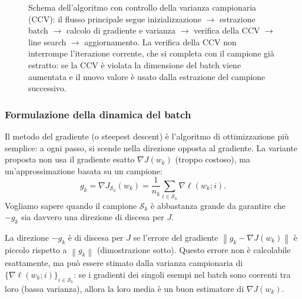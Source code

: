 \documentclass[a4paper,12pt]{article}
\numberwithin{equation}{section}
\numberwithin{figure}{section}
\numberwithin{table}{section}
\newcommand{\norm}[1]{\left\|#1\right\|}
\begin{document}
\begin{figure}[H]
{}
\caption{Schema dell'algoritmo con controllo della varianza campionaria (CCV):
il flusso principale segue inizializzazione $\to$ estrazione batch $\to$
calcolo di gradiente e varianza $\to$ verifica della CCV $\to$ line search
$\to$ aggiornamento. La verifica della CCV non interrompe l'iterazione corrente,
che si completa con il campione gi\`a estratto: se la CCV \`e violata la
dimensione del batch viene aumentata e il nuovo valore \`e usato dalla
estrazione del campione successivo.}
\label{fig:block_diagram}
\end{figure}

\subsubsection{Formulazione della dinamica del batch}

Il metodo del gradiente (o steepest descent) \`e l'algoritmo di ottimizzazione pi\`u semplice: a ogni passo, si scende nella direzione opposta al gradiente. La variante proposta non usa il gradiente esatto $\nabla J(w_k)$ (troppo costoso), ma un'approssimazione basata su un campione:
\[
  g_k = \nabla J_{\mathcal{S}_k}(w_k) = \frac{1}{n_k}\sum_{i \in \mathcal{S}_k} \nabla \ell(w_k;i).
\]
Vogliamo sapere quando il campione $\mathcal{S}_k$ \`e abbastanza grande da garantire che $-g_k$ sia davvero una direzione di discesa per $J$.

La direzione $-g_k$ è di discesa per $J$ se l'errore del gradiente $\norm{g_k - \nabla J(w_k)}$ \`e piccolo rispetto a $\norm{g_k}$ (dimostrazione sotto). Questo errore non \`e calcolabile esattamente, ma pu\`o essere stimato dalla varianza campionaria di $\{{\nabla \ell(w_k;i)}\}_{i \in \mathcal{S}_k}$: se i gradienti dei singoli esempi nel batch sono coerenti tra loro (bassa varianza), allora la loro media \`e un buon estimatore di $\nabla J(w_k)$.
\end{document}
